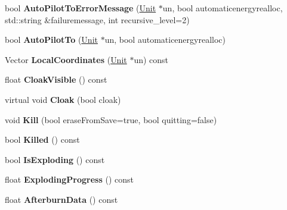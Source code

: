 \begin{DoxyCompactItemize}
\item 
bool {\bfseries Auto\+Pilot\+To\+Error\+Message} (\hyperlink{classUnit}{Unit} $\ast$un, bool automaticenergyrealloc, std\+::string \&failuremessage, int recursive\+\_\+level=2)\hypertarget{classUnit_ab087bed64bd93e302360cee620241033}{}\label{classUnit_ab087bed64bd93e302360cee620241033}

\item 
bool {\bfseries Auto\+Pilot\+To} (\hyperlink{classUnit}{Unit} $\ast$un, bool automaticenergyrealloc)\hypertarget{classUnit_a2b1ccccedbc77043e6f47914d703f6e9}{}\label{classUnit_a2b1ccccedbc77043e6f47914d703f6e9}

\item 
Vector {\bfseries Local\+Coordinates} (\hyperlink{classUnit}{Unit} $\ast$un) const \hypertarget{classUnit_a434a213ab0d3b61cfe127f14053da90a}{}\label{classUnit_a434a213ab0d3b61cfe127f14053da90a}

\item 
float {\bfseries Cloak\+Visible} () const \hypertarget{classUnit_a27109fc918f61131eed6452c2de56d94}{}\label{classUnit_a27109fc918f61131eed6452c2de56d94}

\item 
virtual void {\bfseries Cloak} (bool cloak)\hypertarget{classUnit_ab27901cab93c4f397a2022b376f268bc}{}\label{classUnit_ab27901cab93c4f397a2022b376f268bc}

\item 
void {\bfseries Kill} (bool erase\+From\+Save=true, bool quitting=false)\hypertarget{classUnit_ac33578510975627ff394a867db078bbb}{}\label{classUnit_ac33578510975627ff394a867db078bbb}

\item 
bool {\bfseries Killed} () const \hypertarget{classUnit_a13ac78a1736cd3f9b0c144e870d3d69e}{}\label{classUnit_a13ac78a1736cd3f9b0c144e870d3d69e}

\item 
bool {\bfseries Is\+Exploding} () const \hypertarget{classUnit_aa6a57936e62b3673a917361fd006dd09}{}\label{classUnit_aa6a57936e62b3673a917361fd006dd09}

\item 
float {\bfseries Exploding\+Progress} () const \hypertarget{classUnit_ac6558f82a09504e8915bc153f96a0aa2}{}\label{classUnit_ac6558f82a09504e8915bc153f96a0aa2}

\item 
float {\bfseries Afterburn\+Data} () const \hypertarget{classUnit_a24918d3c77a6ccd5399da4e3110bdd9f}{}\label{classUnit_a24918d3c77a6ccd5399da4e3110bdd9f}


\end{DoxyCompactItemize}
